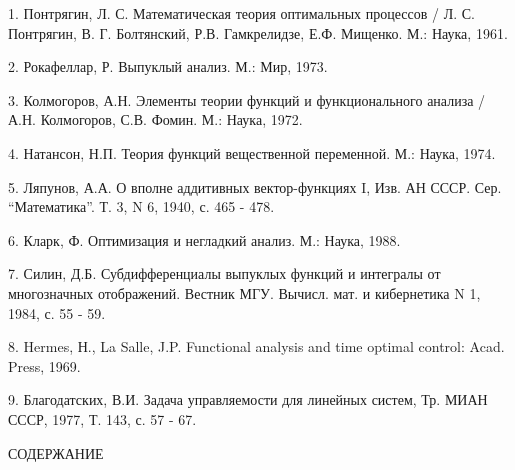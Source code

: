 \documentclass[8pt]{extarticle}
\begin{document}
1. Понтрягин, Л. С. Математическая теория оптимальных процессов / Л. С. Понтрягин, В. Г. Болтянский, Р.В. Гамкрелидзе, Е.Ф. Мищенко. М.: Наука, 1961.

2. Рокафеллар, Р. Выпуклый анализ. М.: Мир, 1973.

3. Колмогоров, А.Н. Элементы теории функций и функционального анализа / А.Н. Колмогоров, С.В. Фомин. М.: Наука, 1972.

4. Натансон, Н.П. Теория функций вещественной переменной. М.: Наука, 1974.

5. Ляпунов, А.А. О вполне аддитивных вектор-функциях I, Изв. АН СССР. Сер. ``Математика''. Т. 3, N 6, 1940, с. 465 - 478.

6. Кларк, Ф. Оптимизация и негладкий анализ. М.: Наука, 1988.

7. Силин, Д.Б. Субдифференциалы выпуклых функций и интегралы от многозначных отображений. Вестник МГУ. Вычисл. мат. и кибернетика N 1, 1984, с. 55 - 59.

8. Hermes, Н., La Salle, J.P. Functional analysis and time optimal control: Acad. Press, 1969.

9. Благодатских, В.И. Задача управляемости для линейных систем, Тр. МИАН СССР, 1977, Т. 143, с. 57 - 67.

\clearpage

\begin{center}
СОДЕРЖАНИЕ
\end{center}
\end{document}
